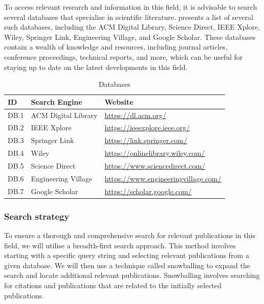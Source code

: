 \documentclass[conference]{IEEEtran}
\begin{document}
To access relevant research and information in this field, it is advisable to
search several databases that specialise in scientific literature.
 presents a list of several such databases, including the
ACM Digital Library, Science Direct, IEEE Xplore, Wiley, Springer Link,
Engineering Village, and Google Scholar. These databases contain a wealth of
knowledge and resources, including journal articles, conference proceedings,
technical reports, and more, which can be useful for staying up to date on the
latest developments in this field.

\begin{table}[!htb] \caption{Databases} \label{tab:databases}
  \begin{center}
    \begin{tabular}[c]{l|l|l} \textbf{ID} & \textbf{Search Engine} &
      \textbf{Website} \\
      \hline DB.1 & ACM Digital Library & \url{https://dl.acm.org/} \\
      \hline DB.2 & IEEE Xplore & \url{https://ieeexplore.ieee.org/} \\
      \hline DB.3 & Springer Link & \url{https://link.springer.com/} \\
      \hline DB.4 & Wiley & \url{https://onlinelibrary.wiley.com/} \\
      \hline DB.5 & Science Direct & \url{https://www.sciencedirect.com/} \\
      \hline DB.6 & Engineering Village &
      \url{https://www.engineeringvillage.com/} \\
      \hline DB.7 & Google Scholar & \url{https://scholar.google.com/} \\
    \end{tabular}
  \end{center}
\end{table}

\subsubsection{Search strategy}

To ensure a thorough and comprehensive search for relevant publications in this
field, we will utilise a breadth-first search approach. This method involves
starting with a specific query string and selecting relevant publications from
a given database. We will then use a technique called snowballing to expand the
search and locate additional relevant publications. Snowballing involves
searching for citations and publications that are related to the initially
selected publications.
\end{document}
